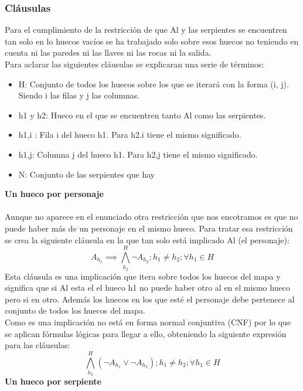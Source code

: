 \documentclass[11pt,spanish]{article}
\begin{document}
			\subsubsection{Cláusulas}
			Para el cumplimiento de la restricción de que Al y las serpientes se encuentren tan solo en lo huecos vacíos se ha trabajado solo sobre esos huecos no teniendo en cuenta ni las paredes ni las llaves ni las rocas ni la salida.\\
			Para aclarar las siguientes cláusulas se explicaran una serie de términos:\\
			\begin{itemize}
				\item H: Conjunto de todos los huecos sobre los que se iterará con la forma (i, j). Siendo i las filas y j las columnas.
				\item h1 y h2: Hueco en el que se encuentren tanto Al como las serpientes.
				\item h1,i : Fila i del hueco h1. Para h2.i tiene el mismo significado.
				\item h1,j: Columna j del hueco h1. Para h2,j tiene el mismo significado.
				\item N: Conjunto de las serpientes que hay
			\end{itemize}
			\textbf{Un hueco por personaje}\\\\
			Aunque no aparece en el enunciado otra restricción que nos encotramos es que no puede haber más de un personaje en el mismo hueco. Para tratar esa restricción se crea la siguiente cláusula en la que tan solo está implicado Al (el personaje):
			\begin{equation*}
				A_{h_1} \implies \bigwedge\limits_{h_2}^H \neg A_{h_2}; h_1 \neq h_2; \forall h_1\in H
			\end{equation*}
			Esta cláusula es una implicación que itera sobre todos los huecos del mapa y significa que si Al esta el el hueco h1 no puede haber otro al en el mismo hueco pero si en otro. Además los huecos en los que esté el personaje debe pertenece al conjunto de todos los huecos del mapa.\\
			Como es una implicación no está en forma normal conjuntiva (CNF) por lo que se aplican fórmulas lógicas para llegar a ello, obteniendo la siguiente expresión para las cláusulas:
			\begin{equation*}
				\bigwedge\limits_{h_2}^H (\neg A_{h_1} \lor \neg A_{h_2}); h_1 \neq h_2; \forall h_1\in H
			\end{equation*}
			\textbf{Un hueco por serpiente}\\\\
\end{document}
